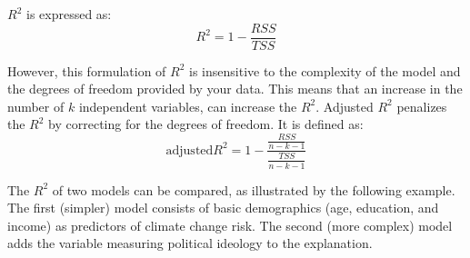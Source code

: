 \documentclass[11pt,openany]{book}\usepackage[]{graphicx}\usepackage[]{color}
\begin{document}
$R^2$ is expressed as: 
\begin{equation}
 R^{2} = 1-\frac{RSS}{TSS}  
\end{equation}

However, this formulation of $R^2$ is insensitive to the complexity of the model and the degrees of freedom provided by your data. This means that an increase in the number of $k$ independent variables, can increase the $R^2$. Adjusted $R^2$ penalizes the $R^2$ by correcting for the degrees of freedom. It is defined as: 
\begin{equation}
 \text{adjusted} R^2 = 1-\frac{\frac{RSS}{n-k-1}}{\frac{TSS}{n-k-1}}
\end{equation}

The $R^2$ of two models can be compared, as illustrated by the following example. The first (simpler) model consists of basic demographics (age, education, and income) as predictors of climate change risk. The second (more complex) model adds the variable measuring political ideology to the explanation.
\end{document}
